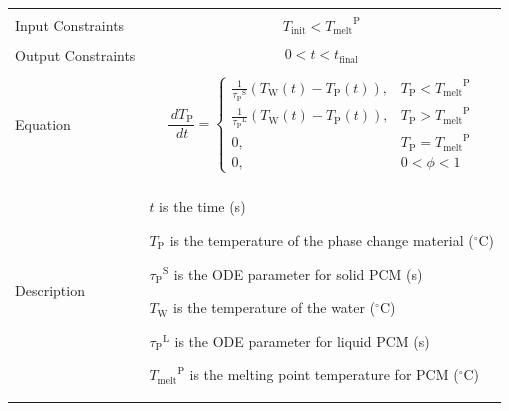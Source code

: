 \documentclass[12pt]{article}
\begin{document}
\begin{minipage}{\textwidth}
\begin{tabular}{>{\raggedright}p{}>{\raggedright\arraybackslash}p{}}
\\ \midrule \\
Input Constraints & \begin{displaymath}
                    {T_{\text{init}}}<{{T_{\text{melt}}}^{\text{P}}}
                    \end{displaymath}
\\ \midrule \\
Output Constraints & \begin{displaymath}
                     0<t<{t_{\text{final}}}
                     \end{displaymath}
\\ \midrule \\
Equation & \begin{displaymath}
           \frac{\,d{T_{\text{P}}}}{\,dt}=\begin{cases}
                                          \frac{1}{{{τ_{\text{P}}}^{\text{S}}}} \left({T_{\text{W}}}\left(t\right)-{T_{\text{P}}}\left(t\right)\right), & {T_{\text{P}}}<{{T_{\text{melt}}}^{\text{P}}}\\
                                          \frac{1}{{{τ_{\text{P}}}^{\text{L}}}} \left({T_{\text{W}}}\left(t\right)-{T_{\text{P}}}\left(t\right)\right), & {T_{\text{P}}}>{{T_{\text{melt}}}^{\text{P}}}\\
                                          0, & {T_{\text{P}}}={{T_{\text{melt}}}^{\text{P}}}\\
                                          0, & 0<ϕ<1
                                          \end{cases}
           \end{displaymath}
\\ \midrule \\
Description & \begin{symbDescription}
              \item{$t$ is the time (s)}
              \item{${T_{\text{P}}}$ is the temperature of the phase change material (${}^{\circ}$C)}
              \item{${{τ_{\text{P}}}^{\text{S}}}$ is the ODE parameter for solid PCM (s)}
              \item{${T_{\text{W}}}$ is the temperature of the water (${}^{\circ}$C)}
              \item{${{τ_{\text{P}}}^{\text{L}}}$ is the ODE parameter for liquid PCM (s)}
              \item{${{T_{\text{melt}}}^{\text{P}}}$ is the melting point temperature for PCM (${}^{\circ}$C)}

\end{symbDescription}
\end{tabular}
\end{minipage}
\end{document}
